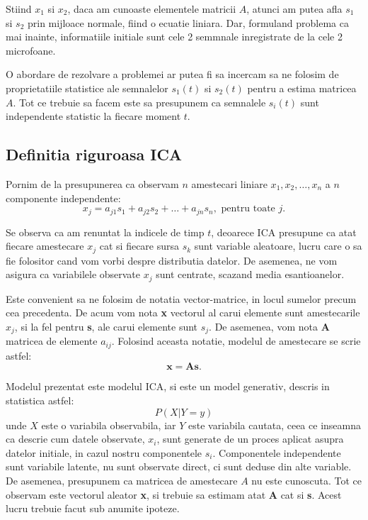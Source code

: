 \documentclass[12pt,oneside]{article}
\begin{document}
Stiind $x_1$ si $x_2$, daca am cunoaste elementele matricii $A$, atunci am putea afla $s_1$ si $s_2$ prin mijloace normale, fiind o ecuatie liniara. Dar, formuland problema ca mai inainte, informatiile initiale sunt cele 2 semmnale inregistrate de la cele 2 microfoane.

O abordare de rezolvare a problemei ar putea fi sa incercam sa ne folosim de proprietatiile statistice ale semnalelor $s_1(t)$ si $s_2(t)$ pentru a estima matricea $A$. Tot ce trebuie sa facem este sa presupunem ca semnalele $s_i(t)$ sunt independente statistic la fiecare moment $t$.

\subsection{Definitia riguroasa ICA}
Pornim de la presupunerea ca observam $n$ amestecari liniare $x_1, x_2, \ldots, x_n$ a $n$ componente independente:
	\begin{equation}
		x_j=a_{j1}s_1+a_{j2}s_2+\ldots+a_{jn}s_n, \text{ pentru toate }j.
	\end{equation}

Se observa ca am renuntat la indicele de timp $t$, deoarece ICA presupune ca atat fiecare amestecare $x_j$ cat si fiecare sursa $s_k$ sunt variable aleatoare, lucru care o sa fie folositor cand vom vorbi despre distributia datelor. De asemenea, ne vom asigura ca variabilele observate $x_j$ sunt centrate, scazand media esantioanelor.

Este convenient sa ne folosim de notatia vector-matrice, in locul sumelor precum cea precedenta. De acum vom nota \textbf{x} vectorul al carui elemente sunt amestecarile $x_j$, si la fel pentru \textbf{s}, ale carui elemente sunt $s_j$. De asemenea, vom nota \textbf{A} matricea de elemente $a_{ij}$. Folosind aceasta notatie, modelul de amestecare se scrie astfel:
\begin{equation}
	\textbf{x}=\textbf{As}.
\end{equation}

Modelul prezentat este modelul ICA, si este un model generativ, descris in statistica astfel:
\begin{equation}
	P(X|Y=y) 
\end{equation}
unde $X$ este o variabila observabila, iar $Y$ este variabila cautata, ceea ce inseamna ca descrie cum datele observate, $x_i$, sunt generate de un proces aplicat asupra datelor initiale, in cazul nostru componentele $s_i$. Componentele independente sunt variabile latente, nu sunt observate direct, ci sunt deduse din alte variable. De asemenea, presupunem ca matricea de amestecare $A$ nu este cunoscuta. Tot ce observam este vectorul aleator \textbf{x}, si trebuie sa estimam atat \textbf{A} cat si \textbf{s}. Acest lucru trebuie facut sub anumite ipoteze.
\end{document}
